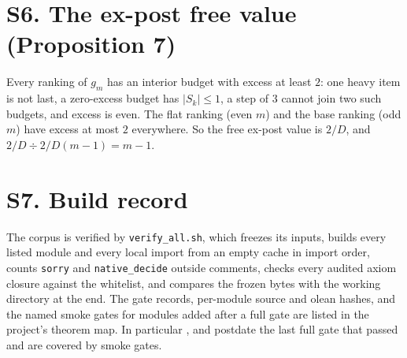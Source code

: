 \section{S6. The ex-post free value (Proposition 7)}

Every ranking of $g_{m}$ has an interior budget with excess at least $2$: one heavy item is
not last, a zero-excess budget has $|S_{k}|\le1$, a step of $3$ cannot join two such budgets,
and excess is even. The flat ranking (even $m$) and the base ranking (odd $m$) have excess
at most $2$ everywhere. So the free ex-post value is $2/D$, and $2/D\div2/D(m-1)=m-1$.


\section{S7. Build record}

The corpus is verified by \texttt{verify\_all.sh}, which freezes its inputs, builds every
listed module and every local import from an empty cache in import order, counts
\texttt{sorry} and \texttt{native\_decide} outside comments, checks every audited axiom
closure against the whitelist, and compares the frozen bytes with the working directory at
the end. The gate records, per-module source and olean hashes, and the named smoke gates for
modules added after a full gate are listed in the project's theorem map. In particular
,  and 
postdate the last full gate that passed and are covered by smoke gates.


